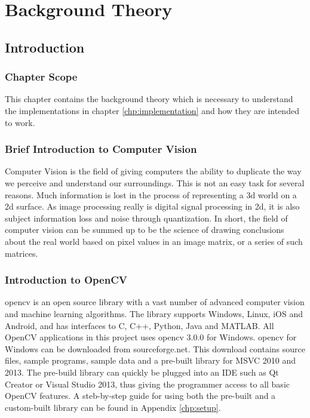 \chapter{Background Theory}\label{chp:theory}

\section{Introduction}

\subsection{Chapter Scope}
This chapter contains the background theory which is necessary to understand the implementations in chapter \ref{chp:implementation} and how they are intended to work. 

\subsection{Brief Introduction to Computer Vision}
Computer Vision is the field of giving computers the ability to duplicate the way we perceive and understand our surroundings. This is not an easy task for several reasons. Much information is lost in the process of representing a 3d world on a 2d surface. As image processing really is digital signal processing in 2d, it is also subject information loss and noise through quantization. In short, the field of computer vision can be summed up to be the science of drawing conclusions about the real world based on pixel values in an image matrix, or a series of such matrices.

\subsection{Introduction to OpenCV}

\gls{opencv} is an  open source library with a vast number of advanced computer vision and machine learning algorithms. The library supports Windows, Linux, iOS and Android, and has interfaces to C, C++, Python, Java and MATLAB. All OpenCV applications in this project uses \gls{opencv} 3.0.0 for Windows. \gls{opencv} for Windows can be downloaded from sourceforge.net. This download contains source files, sample programs, sample data and a pre-built library for MSVC 2010 and 2013. The pre-build library can quickly be plugged into  an IDE such as Qt Creator or Visual Studio 2013, thus giving the programmer access to all basic OpenCV features. A steb-by-step guide for using both the pre-built and a custom-built library can be found in Appendix \ref{chp:setup}.

